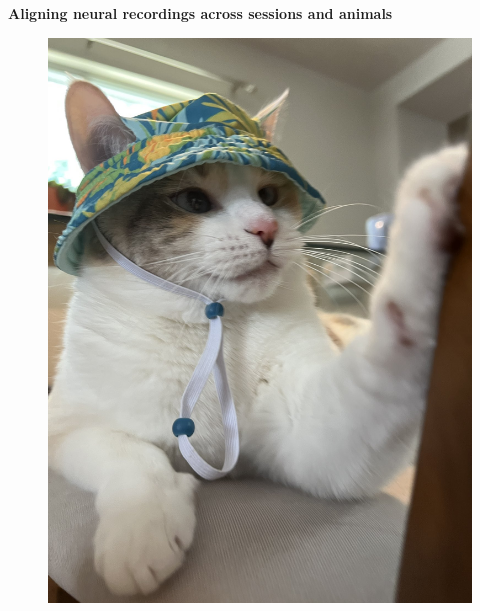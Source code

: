 \documentclass[12pt]{article}
\newcounter{ct}
\begin{document}
%
%





%
%

\begin{center}
    {\Large \textbf{Aligning neural recordings across sessions and animals}}
    


\end{center}

 \begin{figure}
    \begin{center}
    \includegraphics[width=0.5\linewidth]{buckethat.jpg}
    \label{fig:buckethat}
    \end{center}
\end{figure}




% 
% 
% 
\end{document}
